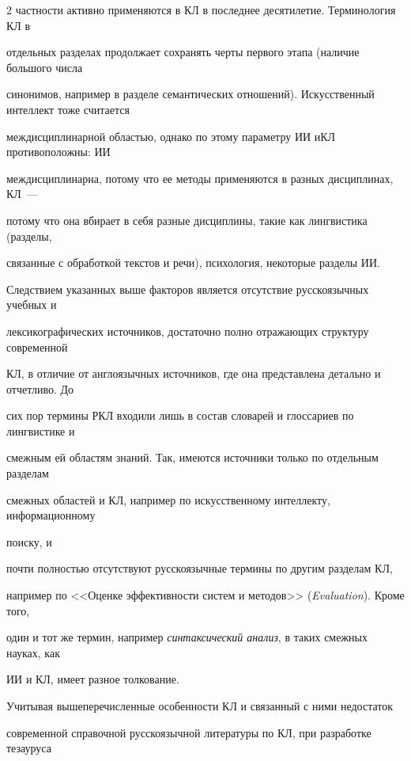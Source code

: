 \begin{multicols}{2}
част\-ности активно применяются в КЛ в последнее десятилетие. Терминология КЛ в 

отдельных разделах продолжает сохранять черты первого этапа (наличие большого числа 

синонимов, например в разделе семантических отношений). Искусственный интеллект тоже считается 

междисциплинарной областью, однако по этому параметру ИИ и\linebreak КЛ противоположны: ИИ 

междисциплинарна, потому что ее методы применяются в разных дис\-цип\-ли\-нах, КЛ~--- 

потому что она вбирает в себя разные дисциплины, такие как лингвистика (разделы, 

связанные с обработкой текстов и речи), психология, некоторые разделы ИИ.

   

   Следствием указанных выше факторов является отсутствие русскоязычных учебных и 

лексикографических источников, достаточно полно отражающих структуру современной 

КЛ, в отличие от англоязычных источников, где она представлена детально и отчетливо. До 

сих пор термины РКЛ входили лишь в состав словарей и глоссариев по лингвистике и 

смежным ей областям знаний. Так, имеются источники только по отдельным разделам\linebreak 

смежных областей и КЛ, например по искусственному интеллекту, информационному 

поиску, и\linebreak

 почти полностью отсутствуют русскоязычные термины по другим разделам КЛ, 

например по <<Оценке эффективности систем и методов>> (\textit{Evaluation}). Кроме того, 

один и тот же термин, например \textit{синтаксический анализ}, в таких смежных науках, как 

ИИ и КЛ, имеет разное толкование. 

  

  Учитывая вышеперечисленные особенности КЛ и связанный с ними недостаток 

современной справочной русскоязычной литературы по КЛ, при разработке тезауруса 


\end{multicols}
